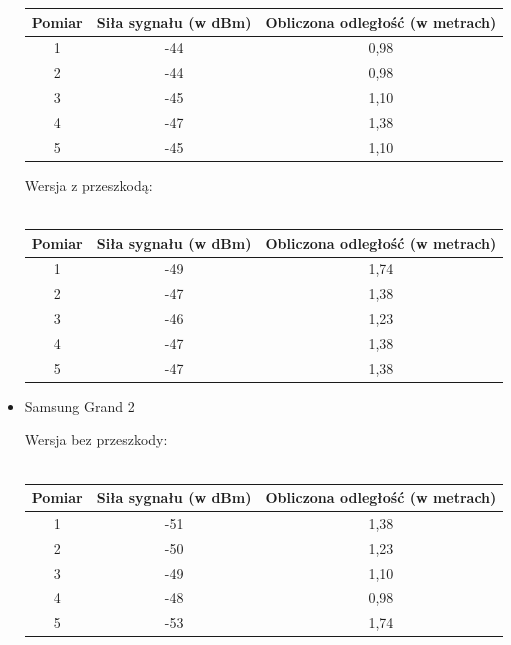 \begin{itemize}
\begin{center}
\begin{minipage}{\linewidth}
\begin{tabular}{|c|c|c|}
				\hline 
				Pomiar & Siła sygnału (w dBm) & Obliczona odległość (w metrach) \\ 
				\hline 
				1 & -44 & 0,98 \\ 
				\hline 
				2 & -44 & 0,98 \\ 
				\hline 
				3 & -45 & 1,10 \\ 
				\hline 
				4 & -47 & 1,38 \\ 
				\hline 
				5 & -45 & 1,10 \\ 
				\hline 
			\end{tabular} 
		\end{minipage} 
	\end{center}
	\begin{center}
		\begin{minipage}{\linewidth}
			Wersja z przeszkodą:\\\\
			\begin{tabular}{|c|c|c|}
				\hline 
				Pomiar & Siła sygnału (w dBm) & Obliczona odległość (w metrach) \\ 
				\hline 
				1 & -49 & 1,74 \\ 
				\hline 
				2 & -47 & 1,38 \\ 
				\hline 
				3 & -46 & 1,23 \\ 
				\hline 
				4 & -47 & 1,38 \\ 
				\hline 
				5 & -47 & 1,38 \\ 
				\hline 
			\end{tabular}
		\end{minipage} 
	\end{center}
	\item Samsung Grand 2
	\begin{center}
		\begin{minipage}{\linewidth}
			Wersja bez przeszkody:\\\\
			\begin{tabular}{|c|c|c|}
				\hline 
				Pomiar & Siła sygnału (w dBm) & Obliczona odległość (w metrach) \\ 
				\hline 
				1 & -51 & 1,38 \\ 
				\hline 
				2 & -50 & 1,23 \\ 
				\hline 
				3 & -49 & 1,10 \\ 
				\hline 
				4 & -48 & 0,98 \\ 
				\hline 
				5 & -53 & 1,74 \\ 
				\hline 
			\end{tabular} 

\end{minipage}
\end{center}
\end{itemize}
